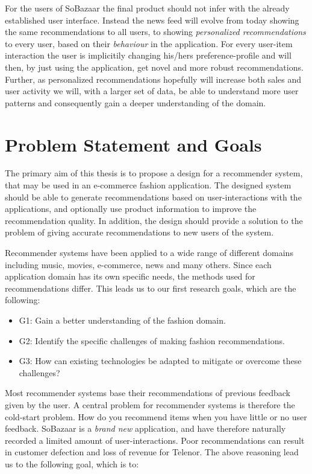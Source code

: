 For the users of SoBazaar the final product should not infer with the already
established user interface. Instead the news feed will evolve from today
showing the same recommendations to all users, to showing \textit{personalized
recommendations} to every user, based on their \textit{behaviour} in the
application. For every user-item interaction the user is implicitily changing
his/hers preference-profile and will then, by just using the application, get
novel and more robust recommendations. Further, as personalized recommendations
hopefully will increase both sales and user activity we will, with a larger set
of data, be able to understand more user patterns and consequently gain a
deeper understanding of the domain.

\section{Problem Statement and Goals}

The primary aim of this thesis is to propose a design for a recommender system, that may be used in an
e-commerce fashion application. The designed system should be able to generate recommendations based on
user-interactions with the applications, and optionally use product information to improve the recommendation
quality. In addition, the design should provide a solution to the problem of giving accurate recommendations
to new users of the system.

Recommender systems have been applied to a wide range of different domains including music, movies, e-commerce, news
and many others. Since each application domain has its own specific needs, the methods used for recommendations differ.
This leads us to our first research goals, which are the following:

\begin{itemize}
	\item G1: Gain a better understanding of the fashion domain.
  	\item G2: Identify the specific challenges of making fashion recommendations.
  	\item G3: How can existing technologies be adapted to mitigate or overcome these challenges?
\end{itemize}

Most recommender systems base their recommendations of previous feedback given by the user. A central problem for
recommender systems is therefore the cold-start problem. How do you recommend items when you have little or no
user feedback. SoBazaar is a \emph{brand new} application, and have therefore naturally recorded a limited amount
of user-interactions. Poor recommendations can result in customer defection and loss of revenue for Telenor.
The above reasoning lead us to the following goal, which is to:

